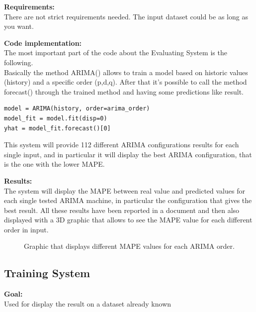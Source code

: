 \textbf{Requirements:}\\
There are not strict requirements needed. The input dataset could be as long as you want.

\textbf{Code implementation:}\\
The most important part of the code about the Evaluating System is the following.\\
Basically the method ARIMA() allows to train a model based on historic values (history) and a specific order (p,d,q). After that it's possible to call the method forecast() through the trained method and having some predictions like result.
\begin{lstlisting}
model = ARIMA(history, order=arima_order)
model_fit = model.fit(disp=0)
yhat = model_fit.forecast()[0]
\end{lstlisting}

This system will provide 112 different ARIMA configurations results for each single input, and in particular it will display the best ARIMA configuration, that is the one with the lower MAPE.

\textbf{Results:}\\
The system will display the MAPE between real value and predicted values for each single tested ARIMA machine, in particular the configuration that gives the best result.
All these results have been reported in a document and then also displayed with a 3D graphic that allows to see the MAPE value for each different order in input.



\begin{figure}[H]
	\raggedleft
    \caption{Graphic that displays different MAPE values for each ARIMA order.}
\end{figure}

 
 
\newpage
\subsection{Training System}
\textbf{Goal:}\\ Used for display the result on a dataset already known


